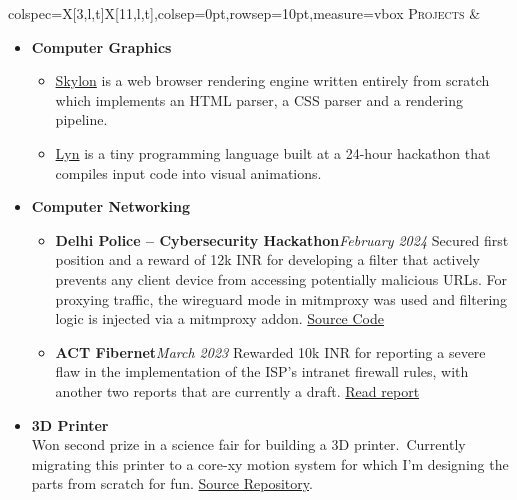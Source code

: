 \documentclass[11pt]{article}
\begin{document}
    \begin{tblr}{colspec={X[3,l,t]X[11,l,t]},colsep=0pt,rowsep=10pt,measure=vbox}
        \textsc{\Large Projects} &
        \vspace*{-1.5\topsep}
        \begin{itemize}[label=\diamond,topsep=0pt,leftmargin=2pt]
            \item \textbf{Computer Graphics}
            \begin{itemize}[label={\tiny\bullet}]
                \item \href{https://github.com/sujaldev/skylon}{\color{blue}Skylon} is a web browser rendering engine
                written entirely from scratch which implements an HTML parser, a CSS parser and a rendering pipeline.
                \item \href{https://github.com/sujaldev/lyn}{\color{blue}Lyn} is a tiny programming language built at a
                24-hour hackathon that compiles input code into visual animations.
            \end{itemize}

            \item \textbf{Computer Networking}
            \begin{itemize}[label={\tiny\bullet}]
                \item \textbf{Delhi Police -- Cybersecurity Hackathon}\hfill\textit{February 2024}\newline
                Secured first position and a reward of 12k INR for developing a filter that actively prevents any client
                device from accessing potentially malicious URLs. For proxying traffic, the wireguard mode in mitmproxy
                was used and filtering logic is injected via a mitmproxy addon.
                \href{https://github.com/sujaldev/cerberus}{\color{blue}Source Code}
                \item \textbf{ACT Fibernet}\hfill\textit{March 2023}\newline
                Rewarded 10k INR for reporting a severe flaw in the implementation of the ISP's intranet firewall rules,
                with another two reports that are currently a draft.
                \href{https://pdf.sujal.dev/act/report.pdf}{\color{blue} Read report}
            \end{itemize}

            \item \textbf{3D Printer}\\
            Won second prize in a science fair for building a 3D printer.\ Currently migrating this printer to a core-xy
            motion system for which I'm designing the parts from scratch for fun.
            \href{https://github.com/xserv-labs/cad}{\color{blue}Source Repository}.


\end{itemize}
\end{tblr}
\end{document}
